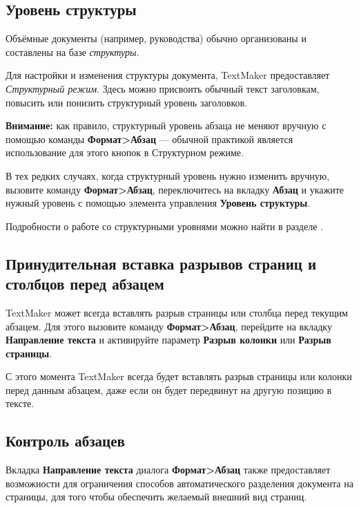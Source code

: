 ﻿\documentclass[a4paper,10pt]{article}
\begin{document}
\subsection{Уровень структуры}
Объёмные документы (например, руководства) обычно организованы и составлены на базе \textit{структуры}.

Для настройки и изменения структуры документа, TextMaker предоставляет \textit{Структурный режим}. Здесь можно присвоить обычный текст заголовкам, повысить или понизить структурный уровень заголовков.

\begin{mdframed}[backgroundcolor=blue!10]
\textbf{Внимание:} как правило, структурный уровень абзаца не меняют вручную с помощью команды \textbf{Формат>Абзац} — обычной практикой является использование для этого кнопок в Структурном режиме.
\end{mdframed}

В тех редких случаях, когда структурный уровень нужно изменить вручную, вызовите команду \textbf{Формат>Абзац}, переключитесь на вкладку \textbf{Абзац} и укажите нужный уровень с помощью элемента управления \textbf{Уровень структуры}.

Подробности о работе со структурными уровнями можно найти в разделе .

\subsection{Принудительная вставка разрывов страниц и столбцов перед абзацем}
TextMaker может всегда вставлять разрыв страницы или столбца перед текущим абзацем. Для этого вызовите команду \textbf{Формат>Абзац}, перейдите на вкладку  \textbf{Направление текста} и активируйте параметр \textbf{Разрыв колонки} или \textbf{Разрыв страницы}.

С этого момента TextMaker всегда будет вставлять разрыв страницы или колонки перед данным абзацем, даже если он будет передвинут на другую позицию в тексте.

\subsection{Контроль абзацев}
Вкладка \textbf{Направление текста} диалога \textbf{Формат>Абзац} также предоставляет возможности для ограничения способов автоматического разделения документа на страницы, для того чтобы обеспечить желаемый внешний вид страниц.
\end{document}
